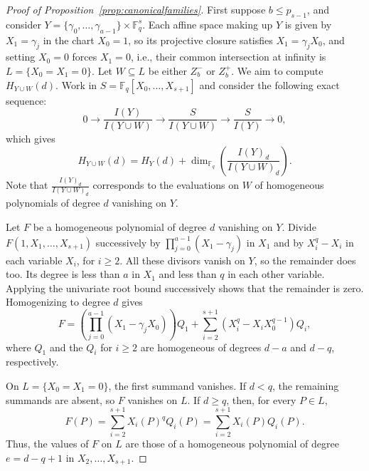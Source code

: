 \documentclass[11pt]{amsart}
\theoremstyle{definition}
\newcommand{\F}{\mathbb F}
\numberwithin{equation}{section}
\begin{document}
\begin{proof}[Proof of Proposition~\ref{prop:canonicalfamilies}]
First suppose $b\le p_{s-1}$, and consider $Y=\{\gamma_0,\ldots,\gamma_{a-1}\}\times\F_q^s$. Each affine space making up $Y$ is given by $X_1=\gamma_j$ in the chart $X_0=1$, so its projective closure satisfies
$X_1=\gamma_jX_0$, and setting $X_0=0$ forces $X_1=0$, i.e., their common intersection at infinity is
$L=\{X_0=X_1=0\}$. Let $W\subseteq L$ be either $Z_b^-$ or $Z_b^+$. We aim to compute $H_{Y\cup W}(d)$. Work in
$S=\F_q[X_0,\ldots,X_{s+1}]$ and consider the following exact sequence: 
\begin{equation}\label{eq:exact_sequence_recursive}
 0\longrightarrow \frac{I(Y)}{I(Y\cup W)}
 \longrightarrow \frac{S}{I(Y\cup W)}
 \longrightarrow \frac{S}{I(Y)}
 \longrightarrow 0,
\end{equation}
which gives
\[
 H_{Y\cup W}(d)
 =H_Y(d)+
 \dim_{\F_q}\left(\frac{I(Y)_d}{I(Y\cup W)_d}\right).
\]
Note that $\frac{I(Y)_d}{I(Y\cup W)_d}$ corresponds to the evaluations on $W$ of homogeneous polynomials of degree $d$ vanishing on $Y$.

Let $F$ be a homogeneous polynomial of degree $d$ vanishing
on $Y$. Divide $F(1,X_1,\ldots,X_{s+1})$ successively by
$\prod_{j=0}^{a-1}(X_1-\gamma_j)$ in $X_1$ and by
$X_i^q-X_i$ in each variable $X_i$, for $i\ge2$.
All these divisors vanish on $Y$, so the remainder does too.
Its degree is less than $a$ in $X_1$ and less than $q$ in
each other variable. Applying the univariate root bound
successively shows that the remainder is zero.
Homogenizing to degree $d$ gives
\[
 F=\left(\prod_{j=0}^{a-1}(X_1-\gamma_jX_0)\right)Q_1
   +\sum_{i=2}^{s+1}(X_i^q-X_iX_0^{q-1})Q_i,
\]
where $Q_1$ and the $Q_i$ for $i\ge2$ are homogeneous of
degrees $d-a$ and $d-q$, respectively.

On $L=\{X_0=X_1=0\}$, the first summand vanishes.
If $d<q$, the remaining summands are absent, so $F$ vanishes
on $L$. If $d\ge q$, then, for every $P\in L$,
\[
 F(P)=\sum_{i=2}^{s+1}X_i(P)^qQ_i(P)
     =\sum_{i=2}^{s+1}X_i(P)Q_i(P).
\]
Thus, the values of $F$ on $L$ are those of a homogeneous
polynomial of degree $e=d-q+1$ in $X_2,\ldots,X_{s+1}$. 


\end{proof}
\end{document}
